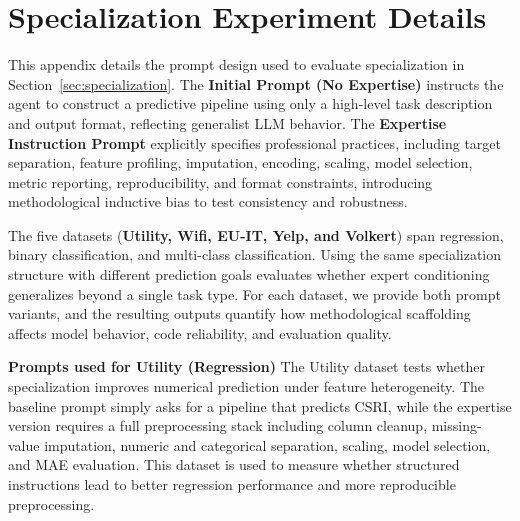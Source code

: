







\section{Specialization Experiment Details}
\label{sec:Specialization_appendix}



This appendix details the prompt design used to evaluate specialization in Section~\ref{sec:specialization}. The \textbf{Initial Prompt (No Expertise)} instructs the agent to construct a predictive pipeline using only a high-level task description and output format, reflecting generalist LLM behavior. The \textbf{Expertise Instruction Prompt} explicitly specifies professional practices, including target separation, feature profiling, imputation, encoding, scaling, model selection, metric reporting, reproducibility, and format constraints, introducing methodological inductive bias to test consistency and robustness.

The five datasets (\textbf{Utility, Wifi, EU-IT, Yelp, and Volkert}) span regression, binary classification, and multi-class classification. Using the same specialization structure with different prediction goals evaluates whether expert conditioning generalizes beyond a single task type. For each dataset, we provide both prompt variants, and the resulting outputs  quantify how methodological scaffolding affects model behavior, code reliability, and evaluation quality.


\newpage

\textbf{Prompts used for Utility (Regression)}  
The Utility dataset tests whether specialization improves numerical prediction under feature heterogeneity.  
The baseline prompt simply asks for a pipeline that predicts CSRI, while the expertise version requires a full preprocessing stack including column cleanup, missing-value imputation, numeric and categorical separation, scaling, model selection, and MAE evaluation. This dataset is used to measure whether structured instructions lead to better regression performance and more reproducible preprocessing.


